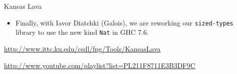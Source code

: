 \begin{hcarentry}[updated]{Kansas Lava}
\begin{itemize}
\item Finally, with Iavor Diatchki (Galois), we are reworking our {\tt sized-types\/}
library to use the new kind {\tt Nat} in GHC 7.6.
\end{itemize}

\FurtherReading
\begin{compactitem}
\item
  \url{http://www.ittc.ku.edu/csdl/fpg/Tools/KansasLava}\\
\item
  \url{http://www.youtube.com/playlist?list=PL211F8711E3B3DF9C}  
\end{compactitem}
\end{hcarentry}
